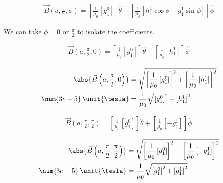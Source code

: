 \documentclass{article}
\begin{document}
{\begin{enumerate}
		\begin{equation*}
			\begin{split}
				\vec{B}\left(a,\frac{\pi}{2},\phi\right) = \left[ \frac{1}{\mu_0} \left[ g^0_1 \right] \right] \hat{\theta}
				+ \left[ \frac{1}{\mu_0} \left[ h^1_1 \cos \phi - g^1_1 \sin \phi \right] \right] \hat{\phi}
			\end{split}
		\end{equation*}
		
		We can take $\phi = 0$ or $\frac{\pi}{2}$ to isolate the coefficients.
		
		\begin{equation*}
			\begin{split}
				\vec{B}\left(a,\frac{\pi}{2},0\right) = \left[ \frac{1}{\mu_0} \left[ g^0_1 \right] \right] \hat{\theta}
				+ \left[ \frac{1}{\mu_0} \left[ h^1_1  \right] \right] \hat{\phi}
			\end{split}
		\end{equation*}
		
		\begin{equation*}
			\begin{split}
				\abs{\vec{B}\left(a,\frac{\pi}{2},0\right)} &= \sqrt{\left[ \frac{1}{\mu_0} \left[ g^0_1 \right] \right]^2
				+ \left[ \frac{1}{\mu_0} \left[ h^1_1  \right] \right]^2} \\
				\num{3e-5} \, \unit{\tesla} &= \frac{1}{\mu_0} \sqrt{\left[ g^0_1 \right]^2
				+ \left[ h^1_1 \right]^2} \\
			\end{split}
		\end{equation*}
		
		\begin{equation*}
			\begin{split}
				\vec{B}\left( a,\frac{\pi}{2},\frac{\pi}{2} \right) = \left[ \frac{1}{\mu_0} \left[ g^0_1 \right] \right] \hat{\theta}
				+ \left[ \frac{1}{\mu_0} \left[ -g^1_1  \right] \right] \hat{\phi}
			\end{split}
		\end{equation*}
		
		\begin{equation*}
			\begin{split}
				\abs{\vec{B}\left( a,\frac{\pi}{2},\frac{\pi}{2} \right)} &= \sqrt{\left[ \frac{1}{\mu_0} \left[ g^0_1 \right] \right]^2
					+ \left[ \frac{1}{\mu_0} \left[ -g^1_1  \right] \right]^2} \\
				\num{3e-5} \, \unit{\tesla} &= \frac{1}{\mu_0} \sqrt{\left[ g^0_1 \right]^2
					+ \left[ g^1_1 \right]^2} \\
			\end{split}
		\end{equation*}
				

\end{enumerate}}
\end{document}
